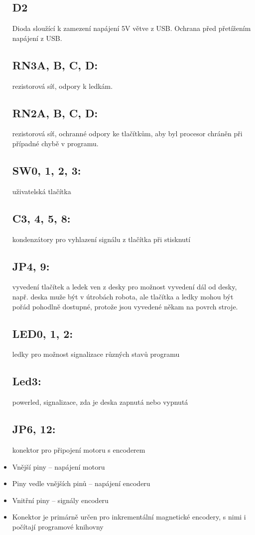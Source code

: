 \documentclass{template/socthesis}
\begin{document}
\begin{itemize}
	\subsection*{D2}
	Dioda sloužící k zamezení napájení 5V větve z USB.
	Ochrana před přetížením napájení z USB.
	
	\subsection*{RN3A, B, C, D:}
	rezistorová síť, odpory k ledkám.
	
	\subsection*{RN2A, B, C, D:}
	rezistorová síť, ochranné odpory ke tlačítkům, aby 
	byl procesor chráněn při případné chybě 
	v programu.
	
	\subsection*{SW0, 1, 2, 3:}
	uživatelská tlačítka
	
	\subsection*{C3, 4, 5, 8:}
	kondenzátory pro vyhlazení signálu z tlačítka při stisknutí
	
	\subsection*{JP4, 9:}
	vyvedení tlačítek a ledek ven z desky pro možnost	
	vyvedení dál od desky, např. deska muže být v útrobách robota, ale tlačítka a ledky mohou být 
	pořád pohodlně dostupné, protože jsou vyvedené	
	někam na povrch stroje.
	
	\subsection*{LED0, 1, 2:}
	ledky pro možnost signalizace různých stavů programu
	
	\subsection*{Led3:}
	powerled, signalizace, zda je deska zapnutá nebo vypnutá
	
	\subsection*{JP6, 12:}
	konektor pro připojení motoru s encoderem
	\item Vnější piny – napájení motoru
	\item Piny vedle vnějších pinů – napájení encoderu
	\item Vnitřní piny – signály encoderu
	\item Konektor je primárně určen pro inkrementální magnetické encodery, s nimi i počítají programové knihovny
	

\end{itemize}
\end{document}
